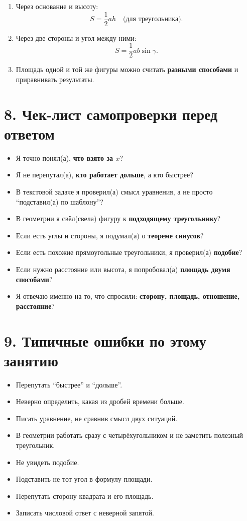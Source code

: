 \documentclass[a4paper,12pt]{article}
\begin{document}
\begin{enumerate}
    \item Через основание и высоту:
    \[
    S=\frac12 ah
    \quad \text{(для треугольника).}
    \]
    \item Через две стороны и угол между ними:
    \[
    S=\frac12 ab\sin\gamma.
    \]
    \item Площадь одной и той же фигуры можно считать \textbf{разными способами} и приравнивать результаты.
\end{enumerate}

\section*{8. Чек-лист самопроверки перед ответом}

\begin{itemize}
    \item Я точно понял(а), \textbf{что взято за $x$}?
    \item Я не перепутал(а), \textbf{кто работает дольше}, а кто быстрее?
    \item В текстовой задаче я проверил(а) смысл уравнения, а не просто ``подставил(а) по шаблону''?
    \item В геометрии я свёл(свела) фигуру к \textbf{подходящему треугольнику}?
    \item Если есть углы и стороны, я подумал(а) о \textbf{теореме синусов}?
    \item Если есть похожие прямоугольные треугольники, я проверил(а) \textbf{подобие}?
    \item Если нужно расстояние или высота, я попробовал(а) \textbf{площадь двумя способами}?
    \item Я отвечаю именно на то, что спросили: \textbf{сторону, площадь, отношение, расстояние}?
\end{itemize}

\section*{9. Типичные ошибки по этому занятию}

\begin{itemize}
    \item Перепутать ``быстрее'' и ``дольше''.
    \item Неверно определить, какая из дробей времени больше.
    \item Писать уравнение, не сравнив смысл двух ситуаций.
    \item В геометрии работать сразу с четырёхугольником и не заметить полезный треугольник.
    \item Не увидеть подобие.
    \item Подставить не тот угол в формулу площади.
    \item Перепутать сторону квадрата и его площадь.
    \item Записать числовой ответ с неверной запятой.
\end{itemize}
\end{document}
